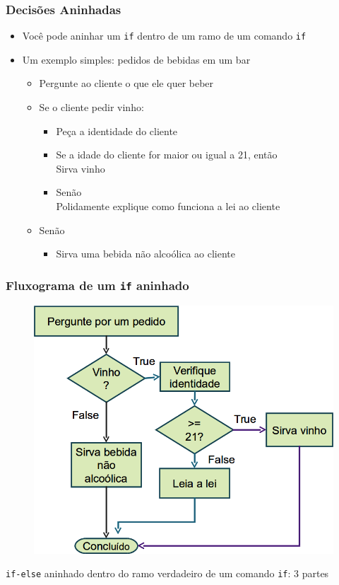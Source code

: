 \documentclass[xcolor={dvipsnames,table},aspectratio=169]{beamer}
\begin{document}
\begin{frame}\frametitle{Decisões Aninhadas}
\begin{itemize}
	\item Você pode aninhar um \texttt{if} dentro de um ramo de um comando \texttt{if}
	\item Um exemplo simples: pedidos de bebidas em um bar
	\begin{itemize}
		\item Pergunte ao cliente o que ele quer beber
		\item Se o cliente pedir vinho:
		\begin{itemize}
			\item Peça a identidade do cliente
			\item Se a idade do cliente for maior ou igual a 21, então\\Sirva vinho
			\item Senão\\Polidamente explique como funciona a lei ao cliente 
		\end{itemize}
		\item Senão
		\begin{itemize}
			\item Sirva uma bebida não alcoólica ao cliente
		\end{itemize}
	\end{itemize}
\end{itemize}
\end{frame}

\begin{frame}\frametitle{Fluxograma de um \texttt{if} aninhado}
\begin{figure}[h]
	\includegraphics[height=0.65\paperheight,center]{pucrs-ep-fprog-unidade_03-decisoes-laminas-fluxograma_bebida.png}
\end{figure}
\begin{center}
{\tiny \texttt{if-else} aninhado dentro do ramo verdadeiro de um comando \texttt{if}: 3 partes}
\end{center}
\end{frame}
\end{document}
